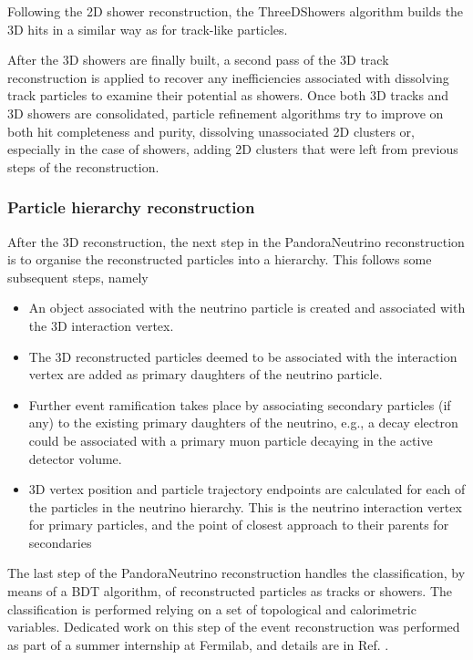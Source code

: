 Following the 2D shower reconstruction, the ThreeDShowers algorithm builds the 3D hits in a similar way as for track-like particles. 

After the 3D showers are finally built, a second pass of the 3D track reconstruction is applied to recover any inefficiencies associated with dissolving track particles to examine their potential as showers. Once both 3D tracks and 3D showers are consolidated, particle refinement algorithms try to improve on both hit completeness and purity, dissolving unassociated 2D clusters or, especially in the case of showers, adding 2D clusters that were left from previous steps of the reconstruction. 

\subsubsection{Particle hierarchy reconstruction}

After the 3D reconstruction, the next step in the PandoraNeutrino reconstruction is to organise the reconstructed particles into a hierarchy. This follows some subsequent steps, namely \begin{itemize}
    \item An object associated with the neutrino particle is created and associated with the 3D interaction vertex.
    \item The 3D reconstructed particles deemed to be associated with the interaction vertex are added as primary daughters of the neutrino particle.
    \item Further event ramification takes place by associating secondary particles (if any) to the existing primary daughters of the neutrino, e.g., a decay electron could be associated with a primary muon particle decaying in the active detector volume.
    \item 3D vertex position and particle trajectory endpoints are calculated for each of the particles in the neutrino hierarchy. This is the neutrino interaction vertex for primary particles, and the point of closest approach to their parents for secondaries
\end{itemize}

The last step of the PandoraNeutrino reconstruction handles the classification, by means of a BDT algorithm, of reconstructed particles as tracks or showers. The classification is performed relying on a set of topological and calorimetric variables. Dedicated work on this step of the event reconstruction was performed as part of a summer internship at Fermilab, and details are in Ref. \cite{Sotgia:2024d}. 

